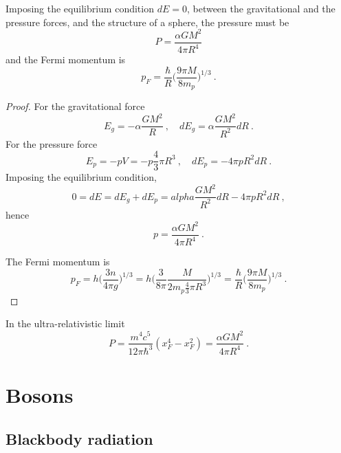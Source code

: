     Imposing the equilibrium condition $dE = 0$, between the gravitational and the pressure forces, and the structure of a sphere, the pressure must be 
    \begin{equation*}
        P = \frac{\alpha G M^2}{4 \pi R^4}
    \end{equation*}
    and the Fermi momentum is 
    \begin{equation*}
        p_F = \frac{\hbar}{R} \Big ( \frac{9 \pi M}{8 m_p} \Big)^{1/3} ~.
    \end{equation*}
    \begin{proof}
        For the gravitational force 
        \begin{equation*}
            E_g = - \alpha \frac{G M^2}{R} ~, \quad dE_g = \alpha \frac{GM^2}{R^2} dR ~.
        \end{equation*}
        For the pressure force 
        \begin{equation*}
            E_p = - p V = - p \frac{4}{3} \pi R^3 ~, \quad dE_p = - 4 \pi p R^2 dR ~.
        \end{equation*}
        Imposing the equilibrium condition, 
        \begin{equation*}
            0 = dE = dE_g + dE_p = alpha \frac{GM^2}{R^2} dR - 4 \pi p R^2 dR ~,
        \end{equation*}
        hence 
        \begin{equation*}
            p = \frac{\alpha G M^2}{4 \pi R^4} ~.
        \end{equation*}

        The Fermi momentum is 
        \begin{equation*}
            p_F = h \Big ( \frac{3 n}{4 \pi g} \Big)^{1/3} = h \Big ( \frac{3}{8 \pi} \frac{M}{2 m_p \frac{4}{3} \pi R^3} \Big)^{1/3} = \frac{\hbar}{R} \Big ( \frac{9 \pi M}{8 m_p} \Big)^{1/3}  ~.
        \end{equation*}
    \end{proof}

    In the ultra-relativistic limit
    \begin{equation*}
        P = \frac{m^4 c^5}{12 \pi \hbar^3} (x_F^4 - x_F^2) = \frac{\alpha G M^2}{4 \pi R^4} ~.
    \end{equation*}

\chapter{Bosons}

\section{Blackbody radiation}